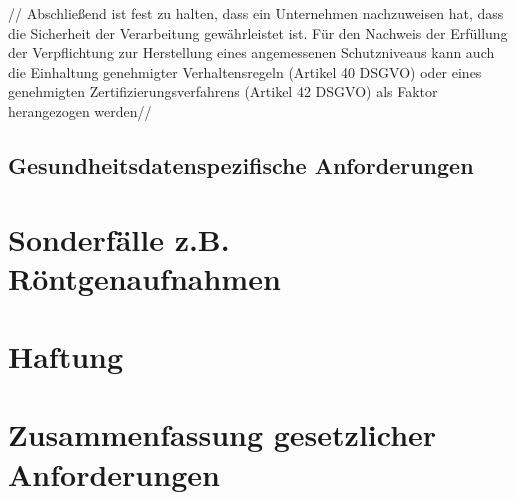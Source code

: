// Abschließend ist fest zu halten, dass ein Unternehmen nachzuweisen hat, dass die Sicherheit der Verarbeitung gewährleistet ist. Für den Nachweis der Erfüllung der Verpflichtung zur Herstellung eines angemessenen Schutzniveaus kann auch die Einhaltung genehmigter Verhaltensregeln (Artikel 40 DSGVO) oder eines genehmigten Zertifizierungsverfahrens (Artikel 42 DSGVO) als Faktor herangezogen werden//

\subsection{Gesundheitsdatenspezifische Anforderungen}\label{subsection:ga}

\section{Sonderfälle z.B. Röntgenaufnahmen}\label{section:sr}

\section{Haftung}\label{section:haftung}

\section{Zusammenfassung gesetzlicher Anforderungen}\label{section:zga}

